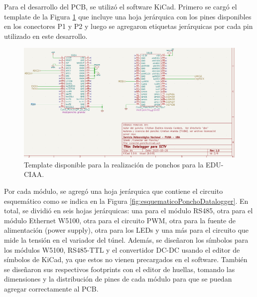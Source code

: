 Para el desarrollo del PCB, se utilizó el software KiCad. Primero se cargó el template de la Figura \ref{fig:HojaTemplatePonchoCiaa} que incluye una hoja jerárquica con los pines disponibles en los conectores P1 y P2 y luego se agregaron etiquetas jerárquicas por cada pin utilizado en este desarrollo.

\begin{figure}[H]
    \centering
    \includegraphics[width=0.95\linewidth]{Figuras/datalogger/Hardware/HojaTemplatePonchoCiaa.png}
    \caption{Template disponible para la realización de ponchos para la EDU-CIAA.}
    \label{fig:HojaTemplatePonchoCiaa}
\end{figure}


Por cada módulo, se agregó una hoja jerárquica que contiene el circuito esquemático como se indica en la Figura \ref{fig:esquematicoPonchoDatalogger}. En total, se dividió en seis hojas jerárquicas: una para el módulo RS485, otra para el módulo Ethernet W5100, otra para el circuito PWM, otra para la fuente de alimentación (power supply), otra para los LEDs y una más para el circuito que mide la tensión en el variador del túnel. Además, se diseñaron los símbolos para los módulos W5100, RS485-TTL y el convertidor DC-DC usando el editor de símbolos de KiCad, ya que estos no vienen precargados en el software. También se diseñaron sus respectivos footprints con el editor de huellas, tomando las dimensiones y la distribución de pines de cada módulo para que se puedan agregar correctamente al PCB.

